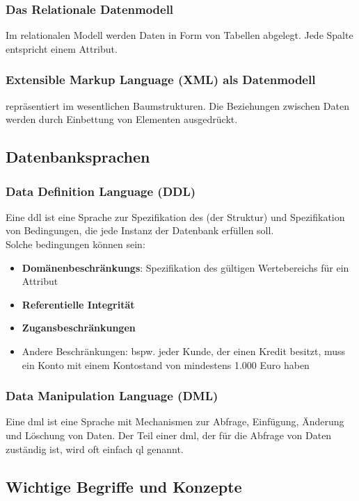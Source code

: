 \subsubsection*{Das Relationale Datenmodell \cite{skript}} \label{sec:reldatm}
Im relationalen Modell werden Daten in Form von Tabellen abgelegt. Jede Spalte entspricht einem \Gls{Attribut}.
\subsubsection*{Extensible Markup Language (XML) als Datenmodell \cite{skript}}
repräsentiert im wesentlichen Baumstrukturen. Die Beziehungen zwischen Daten werden durch Einbettung von Elementen ausgedrückt.
\subsection{Datenbanksprachen}
\subsubsection*{Data Definition Language (DDL) \cite{skript}}
 Eine \Gls{ddl} ist eine Sprache zur Spezifikation des  (der Struktur) und Spezifikation von Bedingungen, die jede \Gls{Instanz} der Datenbank erfüllen soll. \\
 Solche bedingungen können sein: 
 \begin{itemize}
     \item \textbf{\Glspl{Domänenbeschränkung}}: Spezifikation des gültigen Wertebereichs für ein \Gls{Attribut}
     \item \textbf{\Gls{Referentielle Integrität}}
     \item \textbf{Zugansbeschränkungen}
     \item Andere Beschränkungen: bspw. jeder Kunde, der einen Kredit besitzt, muss ein Konto mit einem Kontostand von mindestens 1.000 Euro haben
 \end{itemize}
 \subsubsection*{Data Manipulation Language (DML) \cite{skript}}
 Eine \Gls{dml} ist eine Sprache mit Mechanismen zur Abfrage, Einfügung, Änderung und Löschung von Daten. Der Teil einer \acrshort{dml}, der für die Abfrage von Daten zuständig ist, wird oft einfach \Gls{ql} genannt.
\subsection{Wichtige Begriffe und Konzepte}
